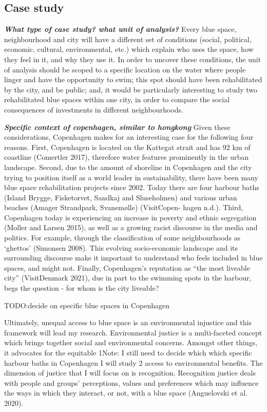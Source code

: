 \documentclass{article}
\newcommand{\bisection}[1]{\textbf{\textit{#1}}}
\begin{document}
\subsection{Case study} 

\bisection{What type of case study? what unit of analysis?}
Every blue space, neighbourhood and city will have a different set of conditions (social, political, economic, cultural, environmental, etc.) which explain who uses the space, how they feel in it, and why they use it. In order to uncover these conditions, the unit of analysis should be scoped to a specific location on the water where people linger and have the opportunity to swim; this spot should have been rehabilitated by the city, and be public; and, it would be particularly interesting to study two rehabilitated blue spaces within one city, in order to compare the social consequences of investments in different neighbourhoods.

\bisection{Specific context of copenhagen, similar to hongkong}
Given these considerations, Copenhagen makes for an interesting case for the following four reasons. First, Copenhagen is located on the Kattegat strait and has 92 km of coastline (Comertler 2017), therefore water features prominently in the urban landscape. Second, due to the amount of shoreline in Copenhagen and the city trying to position itself as a world leader in sustainability, there have been many blue space rehabilitation projects since 2002. Today there are four harbour baths (Island Brygge, Fisketorvet, Sandkaj and Sluseholmen) and various urban beaches (Amager Strandpark, Svanemølle) (VisitCopen- hagen n.d.). Third, Copenhagen today is experiencing an increase in poverty and ethnic segregation (Moller and Larsen 2015), as well as a growing racist discourse in the media and politics. For example, through the classification of some neighbourhoods as ‘ghettos’ (Simonsen 2008). This evolving socio-economic landscape and its surrounding discourse make it important to understand who feels included in blue spaces, and might not. Finally, Copenhagen’s reputation as “the most liveable city” (VisitDenmark 2021), due in part to the swimming spots in the harbour, begs the question - for whom is the city liveable?

TODO:decide on specific blue spaces in Copenhagen



Ultimately, unequal access to blue space is an environmental injustice and this framework will lead my research. Environmental justice is a multi-faceted concept which brings together social and environmental concerns. Amongst other things, it advocates for the equitable
1Note: I still need to decide which which specific harbour baths in Copenhagen I will study
 2
access to environmental benefits. The dimension of justice that I will focus on is recognition. Recognition justice deals with people and groups’ perceptions, values and preferences which may influence the ways in which they interact, or not, with a blue space (Anguelovski et al. 2020).
\end{document}
